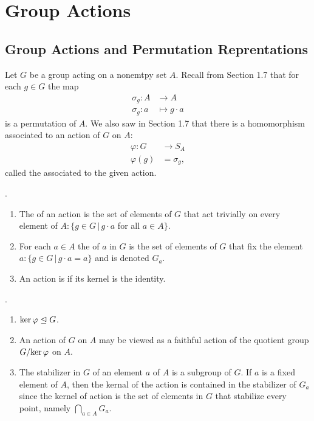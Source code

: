 \documentclass[10pt,a4paper]{report}
\begin{document}
\chapter{Group Actions}

\section{Group Actions and Permutation Reprentations}

\begin{definition}[Action]
Let $G$ be a group acting on a nonemtpy set $A$.  Recall from Section 1.7 that for each $g\in G$ the map
\begin{align*}
	\sigma_g: A &\to A \\
	\sigma_g: a &\mapsto g \cdot a
\end{align*}is a permutation of $A$.  We also saw in Section 1.7 that there is a homomorphism associated to an action of $G$ on $A$:  
\begin{align*}
	\varphi:G &\to S_A \\
	\varphi(g)&= \sigma_g,
\end{align*}called the  associated to the given action.  
\end{definition}

\begin{definition}.
\begin{enumerate}
	\item The  of an action is the set of elements of $G$ that act trivially on every element of $A:\{g\in G\,|\,g\cdot a$ for all $a \in A\}$.
	\item For each $a \in A$ the  of $a$ in $G$ is the set of elements of $G$ that fix the element $a:\{g\in G\,|\, g\cdot a=a\}$ and is denoted $G_a$.
	\item An action is  if its kernel is the identity.
\end{enumerate}
\end{definition}

\begin{remark}.
\begin{enumerate}
	\item $	\text{ker}\, \varphi \trianglelefteq G$.
	\item An action of $G$ on $A$ may be viewed as a  faithful action of the quotient group $G/\text{ker}\, \varphi$ on $A$.
	\item The stabilizer in $G$ of an element $a$ of $A$ is a subgroup of $G$.  If $a$ is a fixed element of $A$, then the kernal of the action is contained in the stabilizer of $G_a$ since the kernel of action is the set of elements in $G$ that stabilize every point, namely $\bigcap_{a \in A} G_a$.
\end{enumerate}
\end{remark}
\end{document}
